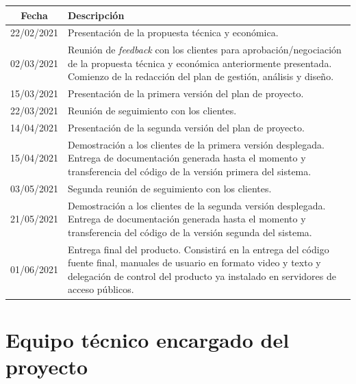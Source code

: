 \documentclass{article}
\begin{document}
\begin{table}[H]
    \centering
    \begin{tabular}{| c | p{30em} |}
    \hline
        Fecha &  Descripción  \\ \hline
        22/02/2021 & Presentación de la propuesta técnica y económica.  \\ \hline
        02/03/2021 & Reunión de \textit{feedback} con los clientes para aprobación/negociación de la propuesta técnica y económica anteriormente presentada. Comienzo de la redacción del plan de gestión, análisis y diseño. \\ \hline
        15/03/2021 & Presentación de la primera versión del plan de proyecto.\\ \hline
        22/03/2021 & Reunión de seguimiento con los clientes. \\ \hline
        14/04/2021 & Presentación de la segunda versión del plan de proyecto. \\ \hline
        15/04/2021 & Demostración a los clientes de la primera versión desplegada.
        Entrega de documentación generada hasta el momento y transferencia del código de la versión primera del sistema.\\ \hline
        03/05/2021 & Segunda reunión de seguimiento con los clientes. \\ \hline
        21/05/2021 & Demostración a los clientes de la segunda versión desplegada.
        Entrega de documentación generada hasta el momento y transferencia del código de la versión segunda del sistema.\\ \hline
        01/06/2021 & Entrega final del producto. Consistirá en la entrega del código fuente final, manuales de usuario en formato video y texto y delegación de control del producto ya instalado en servidores de acceso públicos.\\ \hline
    \end{tabular}
\end{table}

\pagebreak

\section{Equipo técnico encargado del proyecto}
\end{document}
